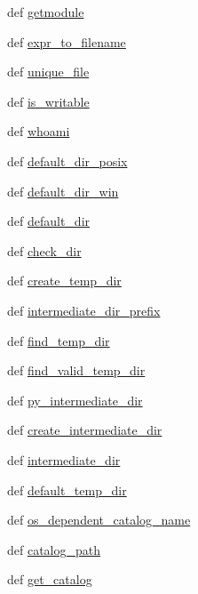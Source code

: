 \begin{DoxyCompactItemize}
\item 
def \hyperlink{namespacescipy_1_1weave_1_1catalog_afa568619b2b11bbeb210094787361019}{getmodule}
\item 
def \hyperlink{namespacescipy_1_1weave_1_1catalog_ae0c26fcf9a5ce2683da68e7f7b2cf40d}{expr\+\_\+to\+\_\+filename}
\item 
def \hyperlink{namespacescipy_1_1weave_1_1catalog_a128d368ff5884d55efc6d62c1f8033fe}{unique\+\_\+file}
\item 
def \hyperlink{namespacescipy_1_1weave_1_1catalog_aff2e838e229eee6aeb0ef72e90f4b659}{is\+\_\+writable}
\item 
def \hyperlink{namespacescipy_1_1weave_1_1catalog_a4f00dab6696fbe9c8a9b0a6d1f1c2cb1}{whoami}
\item 
def \hyperlink{namespacescipy_1_1weave_1_1catalog_afa875243770574501570fa18f7456829}{default\+\_\+dir\+\_\+posix}
\item 
def \hyperlink{namespacescipy_1_1weave_1_1catalog_af30fe14c1facbfc19b2fbcd305f0e27b}{default\+\_\+dir\+\_\+win}
\item 
def \hyperlink{namespacescipy_1_1weave_1_1catalog_a94cbec9df5f1bce9747614dc169f66d5}{default\+\_\+dir}
\item 
def \hyperlink{namespacescipy_1_1weave_1_1catalog_a3b6547c053c18ecf273800fa42de4ed5}{check\+\_\+dir}
\item 
def \hyperlink{namespacescipy_1_1weave_1_1catalog_a592c7de439ce20a4615204c4bc4451c1}{create\+\_\+temp\+\_\+dir}
\item 
def \hyperlink{namespacescipy_1_1weave_1_1catalog_af2dfa2a37432eed3d66f654499f4d114}{intermediate\+\_\+dir\+\_\+prefix}
\item 
def \hyperlink{namespacescipy_1_1weave_1_1catalog_aef385fa4759ed934514110b82b6d56c3}{find\+\_\+temp\+\_\+dir}
\item 
def \hyperlink{namespacescipy_1_1weave_1_1catalog_abdfa347aba9764384ee08c73a45b5d95}{find\+\_\+valid\+\_\+temp\+\_\+dir}
\item 
def \hyperlink{namespacescipy_1_1weave_1_1catalog_a15837988157e52a8d18088bc665da4d9}{py\+\_\+intermediate\+\_\+dir}
\item 
def \hyperlink{namespacescipy_1_1weave_1_1catalog_af3b99fd626a451b7b4e64cd64d174fc2}{create\+\_\+intermediate\+\_\+dir}
\item 
def \hyperlink{namespacescipy_1_1weave_1_1catalog_a78661212e0f0ef2eccd6917eff4a6717}{intermediate\+\_\+dir}
\item 
def \hyperlink{namespacescipy_1_1weave_1_1catalog_a319355e2f43f5e0be443aa629fe75661}{default\+\_\+temp\+\_\+dir}
\item 
def \hyperlink{namespacescipy_1_1weave_1_1catalog_a095ecc625a9121bb47e929698561b56f}{os\+\_\+dependent\+\_\+catalog\+\_\+name}
\item 
def \hyperlink{namespacescipy_1_1weave_1_1catalog_a916aa1ad439d1a91a0b3805e6dbf7e70}{catalog\+\_\+path}
\item 
def \hyperlink{namespacescipy_1_1weave_1_1catalog_aad1c9e9beb4ee205cfafa80dce317b00}{get\+\_\+catalog}
\end{DoxyCompactItemize}
